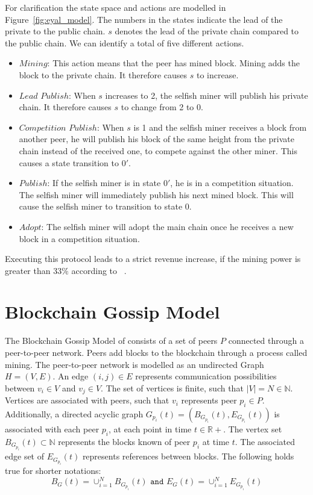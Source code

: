 For clarification the state space and actions are modelled in Figure~\ref{fig:eyal_model}. The numbers in the states indicate the lead of the private to the public chain. $s$ denotes the lead of the private chain compared to the public chain. We can identify a total of five different actions.
\begin{itemize}
\item $Mining$: This action means that the peer has mined block. Mining adds the block to the private chain. It therefore causes $s$ to increase.
\item $Lead$ $Publish$: When $s$ increases to 2, the selfish miner will publish his private chain. It therefore causes $s$ to change from 2 to 0.
\item $Competition$ $Publish$: When $s$ is 1 and the selfish miner receives a block from another peer, he will publish his block of the same height from the private chain instead of the received one, to compete against the other miner. This causes a state transition to $0'$.
\item $Publish$: If the selfish miner is in state $0'$, he is in a competition situation.
The selfish miner will immediately publish his next mined block. This will cause the selfish miner to transition to state $0$.
\item $Adopt$: The selfish miner will adopt the main chain once he receives a new block in a competition situation.
\end{itemize}
Executing this protocol leads to a strict revenue increase, if the mining power is greater than $33\%$ according to \citeauthor{eyal}~\cite{eyal}.


\section{Blockchain Gossip Model}\label{gopalan}
The Blockchain Gossip Model of \citeauthor{gopalan} consists of a set of peers $P$ connected through a peer-to-peer network. Peers add blocks to the blockchain through a process called mining. 
The peer-to-peer network is modelled as an undirected Graph $H = (V,E)$.
An edge $(i,j) \in E$ represents communication possibilities between $v_i \in V$ and $v_j \in V$. 
The set of vertices is finite, such that $|V|=N \in \mathbb{N}$.
Vertices are associated with peers, such that $v_i$ represents peer $p_i \in P$.
Additionally, a directed acyclic graph $G_{p_i}(t) = (B_{G_{p_i}}(t),E_{G_{p_i}}(t))$ is associated with each peer $p_i$, at each point in time $t \in \mathbb{R+}$.
The vertex set $B_{G_{p_i}}(t) \subset \mathbb{N}$ represents the blocks known of peer $p_i$ at time $t$. The associated edge set of $E_{G_{p_i}}(t)$ represents references between blocks.
The following holds true for shorter notations:
\begin{equation}
B_G(t) = \cup_{i=1}^N B_{G_{p_i}}(t) \texttt{ and } E_G(t) = \cup_{i=1}^N E_{G_{p_i}}(t)
\label{unisondef}
\end{equation}

